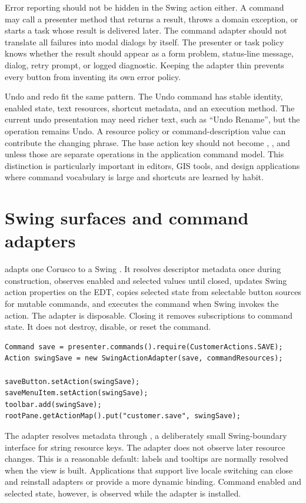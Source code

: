 Error reporting should not be hidden in the Swing action either. A command may
call a presenter method that returns a result, throws a domain exception, or
starts a task whose result is delivered later. The command adapter should not
translate all failures into modal dialogs by itself. The presenter or task
policy knows whether the result should appear as a form problem, status-line
message, dialog, retry prompt, or logged diagnostic. Keeping the adapter thin
prevents every button from inventing its own error policy.

Undo and redo fit the same pattern. The Undo command has stable identity,
enabled state, text resources, shortcut metadata, and an execution method.
The current undo presentation may need richer text, such as ``Undo Rename'',
but the operation remains Undo. A resource policy or command-description
value can contribute the changing phrase. The base action key should not
become , , and  unless those
are separate operations in the application command model. This distinction is
particularly important in editors, GIS tools, and design applications where
command vocabulary is large and shortcuts are learned by habit.

\section{Swing surfaces and command adapters}

 adapts one Corusco  to a Swing
. It resolves descriptor metadata once during construction,
observes enabled and selected values until closed, updates Swing action
properties on the EDT, copies selected state from selectable button sources for
mutable commands, and executes the command when Swing invokes the action. The
adapter is disposable. Closing it removes subscriptions to command state. It
does not destroy, disable, or reset the command.

\begin{lstlisting}[caption={One command adapted to several Swing surfaces.}]
Command save = presenter.commands().require(CustomerActions.SAVE);
Action swingSave = new SwingActionAdapter(save, commandResources);

saveButton.setAction(swingSave);
saveMenuItem.setAction(swingSave);
toolbar.add(swingSave);
rootPane.getActionMap().put("customer.save", swingSave);
\end{lstlisting}

The adapter resolves metadata through , a deliberately
small Swing-boundary interface for string resource keys. The adapter does not
observe later resource changes. This is a reasonable default: labels and
tooltips are normally resolved when the view is built. Applications that
support live locale switching can close and reinstall adapters or provide a
more dynamic binding. Command enabled and selected state, however, is observed
while the adapter is installed.

